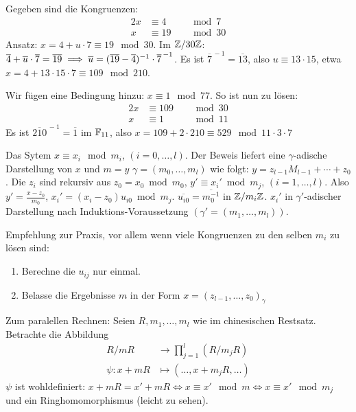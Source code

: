 \documentclass[a4paper,DIV15,BCOR12mm]{article}
\begin{document}
\begin{beispiel}
Gegeben sind die Kongruenzen:
\begin{alignat*}{2}
    x &\equiv 4 &&\mod 7\\
    x &\equiv 19 &&\mod 30
\end{alignat*}
Ansatz: $x=4 + u\cdot 7 \equiv 19 \mod 30$. Im $\mathbb{Z}/30\mathbb{Z}$:
$\overline 4 + \overline u\cdot \overline 7  = \overline {19} \implies
\overline u = (\overline {19} - \overline 4)^{-1} \cdot \overline
7^{\,-1}$. Es ist $\overline 7^{\,-1}=\overline {13}$, also $u
\equiv 13\cdot 15$, etwa $x = 4 + 13 \cdot 15  \cdot 7 \equiv 109
\mod 210$.

Wir fügen eine Bedingung hinzu: $x\equiv 1 \mod 77$. So ist nun zu
lösen:
\begin{alignat*}{2}
    x &\equiv 109 &&\mod 30\\
    x &\equiv 1 &&\mod 11
\end{alignat*}
Es ist $\overline {210}^{\,-1} = \overline 1$ im $\mathbb{F}_{11}$, also
$x=109+2\cdot 210 \equiv 529 \mod 11\cdot3\cdot 7$
\end{beispiel}

\begin{bemerkung}[zur Praxis]
Das Sytem $x\equiv x_i \mod m_i$, $(i=0,\ldots,l)$. Der Beweis
liefert eine $\gamma$-adische Darstellung von $x$ und $m=y$
$\gamma=(m_0,\ldots,m_l)$ wie folgt: $y = z_{l-1}M_{l-1}+\cdots+
z_0$. Die $z_i$ sind rekursiv aus $z_0 = x_0 \bmod m_0$, $y' \equiv
x_i' \bmod m_j$, $(i=1,\ldots,l)$. Also $y'=\frac{x-z_0}{m_0}$,
$x_i' = (x_i - z_0)u_{i0} \bmod m_j$. $\overline {u_{i0}} =
\overline {m_0^{-1}}$ in $\mathbb{Z}/m_i\mathbb{Z}$. $x_i'$ in
$\gamma'$-adischer Darstellung nach Induktions-Voraussetzung
$(\gamma'=(m_1,\ldots,m_l))$.

Empfehlung zur Praxis, vor allem wenn viele Kongruenzen zu den
selben $m_i$ zu lösen sind:
\begin{enumerate}
\item Berechne die $u_{ij}$ nur einmal.
\item Belasse die Ergebnisse $m$ in der Form $x=(z_{l-1},\ldots,z_0)_\gamma$
\end{enumerate}
\end{bemerkung}

Zum paralellen Rechnen: Seien $R,m_1,\ldots,m_l$ wie im chinesischen
Restsatz. Betrachte  die Abbildung
\begin{align*}
R/mR &\to \prod_{j=1}^l (R/m_jR) \\
\psi: x + mR &\mapsto (\ldots, x + m_jR, \ldots )
\end{align*}
$\psi$ ist wohldefiniert: $x+mR = x'+mR \iff x \equiv x' \mod m \iff
x \equiv x' \mod m_j$ und ein Ringhomomorphismus (leicht zu sehen).
\end{document}
